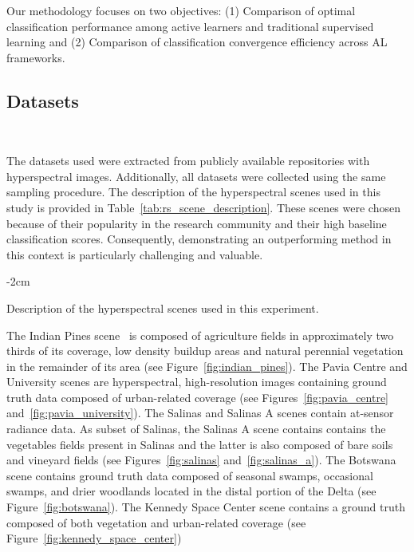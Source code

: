 \documentclass[preprint,12pt]{elsarticle}
\begin{document}
Our methodology focuses on two objectives: (1) Comparison of optimal
classification performance among active learners and traditional supervised
learning and (2) Comparison of classification convergence efficiency across AL
frameworks.

\subsection{Datasets}~\label{sec:datasets}

The datasets used were extracted from publicly available repositories with
hyperspectral images. Additionally, all datasets were collected using the
same sampling procedure. The description of the hyperspectral scenes used in
this study is provided in Table~\ref{tab:rs_scene_description}. These scenes
were chosen because of their popularity in the research community and their
high baseline classification scores. Consequently, demonstrating an
outperforming method in this context is particularly challenging and valuable.


\begin{table}[bp]
    \centering
    \addtolength{\leftskip} {-2cm}
    \addtolength{\rightskip}{-2cm}
    \caption{\label{tab:rs_scene_description}
        Description of the hyperspectral scenes used in this experiment.}
\end{table}

The Indian Pines scene~\cite{Baumgardner2015} is composed of agriculture fields
in approximately two thirds of its coverage, low density buildup areas and
natural perennial vegetation in the remainder of its area (see
Figure~\ref{fig:indian_pines}). The Pavia Centre and University scenes are
hyperspectral, high-resolution images containing ground truth data composed of
urban-related coverage (see Figures~\ref{fig:pavia_centre}
and~\ref{fig:pavia_university}). The Salinas and Salinas A scenes contain
at-sensor radiance data. As subset of Salinas, the Salinas A scene contains
contains the vegetables fields present in Salinas and the latter is also
composed of bare soils and vineyard fields (see Figures~\ref{fig:salinas}
and~\ref{fig:salinas_a}). The Botswana scene contains ground truth data
composed of seasonal swamps, occasional swamps, and drier woodlands located in
the distal portion of the Delta (see Figure~\ref{fig:botswana}). The Kennedy
Space Center scene contains a ground truth composed of both vegetation and
urban-related coverage (see Figure~\ref{fig:kennedy_space_center})
\end{document}
